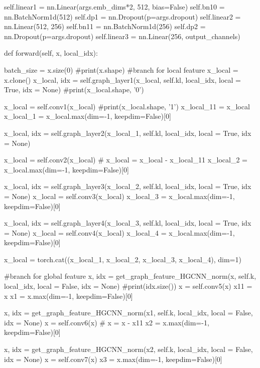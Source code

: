         self.linear1 = nn.Linear(args.emb_dims*2, 512, bias=False)
        self.bn10 = nn.BatchNorm1d(512)
        self.dp1 = nn.Dropout(p=args.dropout)
        self.linear2 = nn.Linear(512, 256)
        self.bn11 = nn.BatchNorm1d(256)
        self.dp2 = nn.Dropout(p=args.dropout)
        self.linear3 = nn.Linear(256, output_channels)

    def forward(self, x, local_idx):
        
        batch_size = x.size(0)
        #print(x.shape)
        #branch for local feature
        x_local = x.clone()
        x_local, idx = self.graph_layer1(x_local, self.kl, local_idx, local = True, idx = None)
        #print(x_local.shape, '0')
        
        x_local = self.conv1(x_local)
        #print(x_local.shape, '1')
        x_local_11 = x_local
        x_local_1 = x_local.max(dim=-1, keepdim=False)[0]
        
        x_local, idx = self.graph_layer2(x_local_1, self.kl, local_idx, local = True, idx = None)
        
        x_local = self.conv2(x_local)
        # x_local = x_local - x_local_11
        x_local_2 = x_local.max(dim=-1, keepdim=False)[0]

        x_local, idx = self.graph_layer3(x_local_2, self.kl, local_idx, local = True, idx = None)
        x_local = self.conv3(x_local)
        x_local_3 = x_local.max(dim=-1, keepdim=False)[0]

        x_local, idx = self.graph_layer4(x_local_3, self.kl, local_idx, local = True, idx = None)
        x_local = self.conv4(x_local)
        x_local_4 = x_local.max(dim=-1, keepdim=False)[0]

        x_local = torch.cat((x_local_1, x_local_2, x_local_3, x_local_4), dim=1)      
       
        
        #branch for global feature
        x, idx = get_graph_feature_HGCNN_norm(x, self.k, local_idx, local = False, idx = None)
        #print(idx.size())
        x = self.conv5(x)
        x11 = x
        x1 = x.max(dim=-1, keepdim=False)[0]
        

        x, idx = get_graph_feature_HGCNN_norm(x1, self.k, local_idx, local = False, idx = None)
        x = self.conv6(x)
        # x = x - x11
        x2 = x.max(dim=-1, keepdim=False)[0]

        x, idx = get_graph_feature_HGCNN_norm(x2, self.k, local_idx, local = False, idx = None)
        x = self.conv7(x)
        x3 = x.max(dim=-1, keepdim=False)[0]

